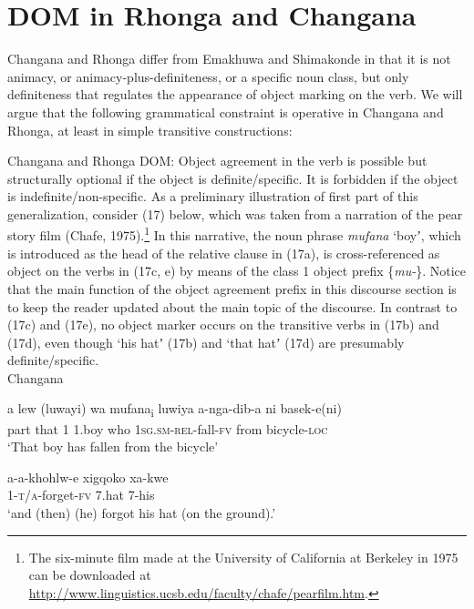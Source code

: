 \documentclass[output=paper]{langsci/langscibook}
\begin{document}
\section{DOM in Rhonga and Changana}

Changana and Rhonga differ from Emakhuwa and Shimakonde in that it is not animacy, or animacy-plus-definiteness, or a specific noun class, but only definiteness that regulates the appearance of object marking on the verb. We will argue that the following grammatical constraint is operative in Changana and Rhonga, at least in simple transitive constructions:

{Changana and Rhonga DOM: Object agreement in the verb is possible but structurally optional if the object is definite/specific. It is forbidden if the object is indefinite/non-specific.}
     {As a preliminary illustration of first part of this generalization, consider }(17) {below, which was taken from a narration of the pear story film (Chafe, 1975).}\footnote{ {The six-minute film made at the University of California at Berkeley in 1975 can be downloaded at }\url{http://www.linguistics.ucsb.edu/faculty/chafe/pearfilm.htm}{.}} {In this narrative, the noun phrase }{\textit{mufana}} {‘boyʼ, which is introduced as the head of the relative clause in (17a), is cross-referenced as object on the verbs in (17c, e) by means of the class 1 object prefix \{}{\textit{mu-}}{\}. Notice that the main function of the object agreement prefix in this discourse section is to keep the reader updated about the} {}{main topic of the discourse. In contrast to (17c) and (17e), no object marker occurs on the transitive verbs in (17b) and (17d), even though ‘his hatʼ (17b) and ‘that hatʼ (17d) are presumably definite/specific.}\\
{Changana}

\ea
\gll a         lew (luwayi)  wa    mufana\textup{\textsubscript{i}}   luwiya    a-nga-dib-a             ni          basek-e(ni)\\
     part    that                 1      1.boy       who       \textsc{1sg.sm-rel}{}-fall-\textsc{fv}  from     bicycle-\textsc{loc}\\
\glt ‘That boy has fallen from the bicycle’
\z


\ea
\gll a-a-khohlw-e               xigqoko          xa-kwe\\
     1-\textsc{t/a}{}-forget-\textsc{fv}           7.hat                7-his\\
\glt ‘and (then) (he) forgot his hat (on the ground).’
\z
\end{document}
